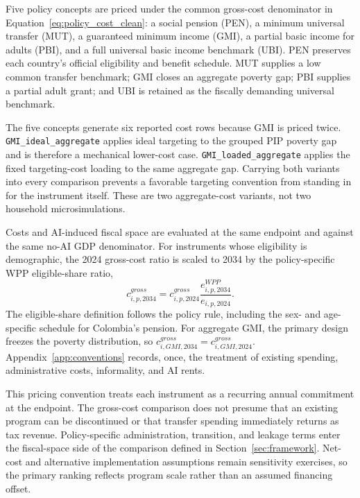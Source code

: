 Five policy concepts are priced under the common gross-cost denominator in Equation~\eqref{eq:policy_cost_clean}: a social pension (PEN), a minimum universal transfer (MUT), a guaranteed minimum income (GMI), a partial basic income for adults (PBI), and a full universal basic income benchmark (UBI). PEN preserves each country's official eligibility and benefit schedule. MUT supplies a low common transfer benchmark; GMI closes an aggregate poverty gap; PBI supplies a partial adult grant; and UBI is retained as the fiscally demanding universal benchmark.

The five concepts generate six reported cost rows because GMI is priced twice. \nolinkurl{GMI_ideal_aggregate} applies ideal targeting to the grouped PIP poverty gap and is therefore a mechanical lower-cost case. \nolinkurl{GMI_loaded_aggregate} applies the fixed targeting-cost loading to the same aggregate gap. Carrying both variants into every comparison prevents a favorable targeting convention from standing in for the instrument itself. These are two aggregate-cost variants, not two household microsimulations.

Costs and AI-induced fiscal space are evaluated at the same endpoint and against the same no-AI GDP denominator. For instruments whose eligibility is demographic, the 2024 gross-cost ratio is scaled to 2034 by the policy-specific WPP eligible-share ratio,
\begin{equation}
  c^{gross}_{i,p,2034}
  =c^{gross}_{i,p,2024}
   \frac{e^{WPP}_{i,p,2034}}{e_{i,p,2024}}.
  \label{eq:endpoint_cost_clean}
\end{equation}
The eligible-share definition follows the policy rule, including the sex- and age-specific schedule for Colombia's pension. For aggregate GMI, the primary design freezes the poverty distribution, so $c^{gross}_{i,GMI,2034}=c^{gross}_{i,GMI,2024}$. Appendix~\ref{app:conventions} records, once, the treatment of existing spending, administrative costs, informality, and AI rents.

This pricing convention treats each instrument as a recurring annual commitment at the endpoint. The gross-cost comparison does not presume that an existing program can be discontinued or that transfer spending immediately returns as tax revenue. Policy-specific administration, transition, and leakage terms enter the fiscal-space side of the comparison defined in Section~\ref{sec:framework}. Net-cost and alternative implementation assumptions remain sensitivity exercises, so the primary ranking reflects program scale rather than an assumed financing offset.

